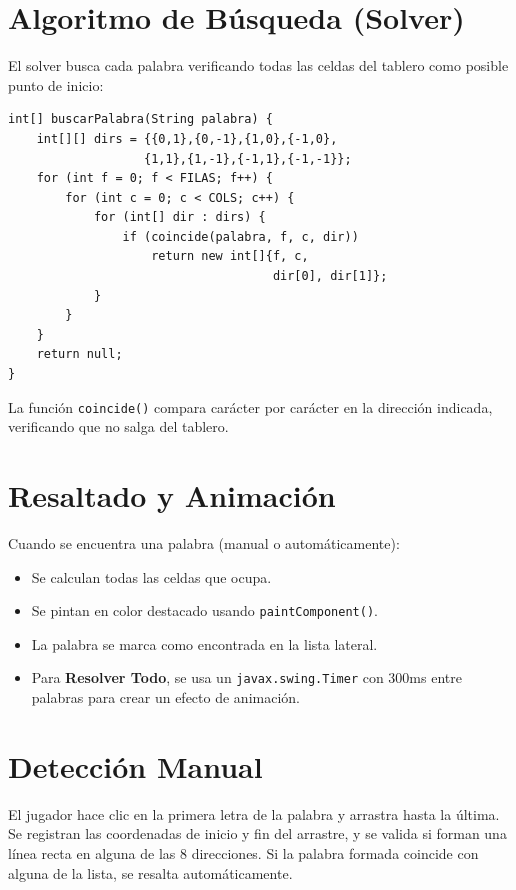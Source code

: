 \documentclass[12pt,a4paper]{article}
\begin{document}
\section{Algoritmo de Búsqueda (Solver)}

El solver busca cada palabra verificando todas las celdas del tablero como posible punto de inicio:

\begin{lstlisting}
int[] buscarPalabra(String palabra) {
    int[][] dirs = {{0,1},{0,-1},{1,0},{-1,0},
                   {1,1},{1,-1},{-1,1},{-1,-1}};
    for (int f = 0; f < FILAS; f++) {
        for (int c = 0; c < COLS; c++) {
            for (int[] dir : dirs) {
                if (coincide(palabra, f, c, dir))
                    return new int[]{f, c,
                                     dir[0], dir[1]};
            }
        }
    }
    return null;
}
\end{lstlisting}

La función \texttt{coincide()} compara carácter por carácter en la dirección indicada, verificando que no salga del tablero.

\section{Resaltado y Animación}

Cuando se encuentra una palabra (manual o automáticamente):
\begin{itemize}
  \item Se calculan todas las celdas que ocupa.
  \item Se pintan en color destacado usando \texttt{paintComponent()}.
  \item La palabra se marca como encontrada en la lista lateral.
  \item Para \textbf{Resolver Todo}, se usa un \texttt{javax.swing.Timer} con 300ms entre palabras para crear un efecto de animación.
\end{itemize}

\section{Detección Manual}

El jugador hace clic en la primera letra de la palabra y arrastra hasta la última. Se registran las coordenadas de inicio y fin del arrastre, y se valida si forman una línea recta en alguna de las 8 direcciones. Si la palabra formada coincide con alguna de la lista, se resalta automáticamente.
\end{document}
